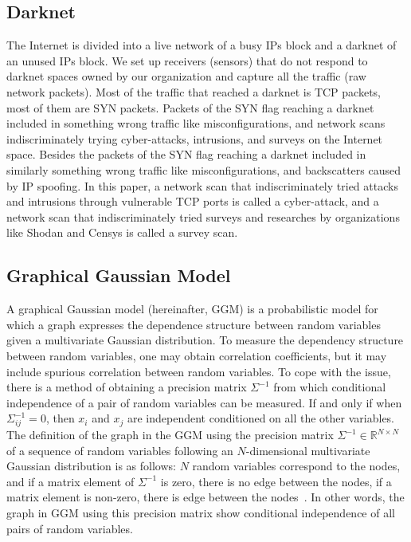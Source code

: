 \documentclass[conference]{IEEEtran}
\begin{document}
\subsection{Darknet}
The Internet is divided into a live network of a busy IPs block and a darknet of an unused IPs block.
We set up receivers (sensors) that do not respond to darknet spaces owned by our organization and capture all the traffic (raw network packets).
Most of the traffic that reached a darknet is TCP packets, most of them are SYN packets.
Packets of the SYN flag reaching a darknet included in something wrong traffic like misconfigurations, and network scans indiscriminately trying cyber-attacks, intrusions, and surveys on the Internet space.
Besides the packets of the SYN flag reaching a darknet included in similarly something wrong traffic like misconfigurations, and backscatters caused by IP spoofing.
In this paper, a network scan that indiscriminately tried attacks and intrusions through vulnerable TCP ports is called a cyber-attack, and a network scan that indiscriminately tried surveys and researches by organizations like Shodan and Censys is called a survey scan.



\subsection{Graphical Gaussian Model}
A graphical Gaussian model (hereinafter, GGM) is a probabilistic model for which a graph expresses the dependence structure between random variables given a multivariate Gaussian distribution.
To measure the dependency structure between random variables, one may obtain correlation coefficients, but it may include spurious correlation between random variables.
To cope with the issue, there is a method of obtaining a precision matrix $\Sigma^{-1}$ from which conditional independence of a pair of random variables can be measured.
If and only if when $\Sigma^{-1}_{ij}=0$, then $x_ {i}$ and $x_ {j}$ are independent conditioned on all the other variables.
The definition of the graph in the GGM using the precision matrix $\Sigma^{-1}\in\mathbb{R}^{N \times N}$ of a sequence of random variables following an $N$-dimensional multivariate Gaussian distribution is as follows: $N$ random variables correspond to the nodes, and if a matrix element of $\Sigma^{-1}$ is zero, there is no edge between the nodes, if a matrix element is non-zero, there is edge between the nodes~\cite{Ide}.
In other words, the graph in GGM using this precision matrix show conditional independence of all pairs of random variables.
\end{document}
